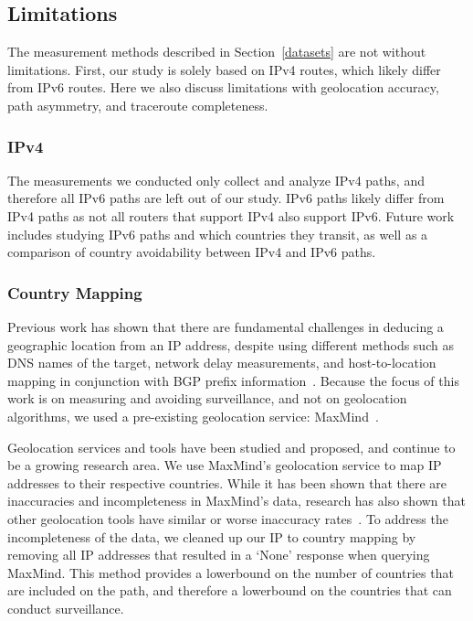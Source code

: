 \subsection{Limitations}
The measurement methods described in Section~\ref{datasets} are not without limitations.  First, our study is solely based on IPv4 routes, which likely differ from IPv6 routes.  Here we also discuss limitations with geolocation accuracy, path asymmetry, and traceroute completeness.

\subsubsection{IPv4}
The measurements we conducted only collect and analyze IPv4 paths, and therefore all IPv6 paths are left out of our study.  IPv6 paths likely differ from IPv4 paths as not all routers that support IPv4 also support IPv6.  Future work includes studying IPv6 paths and which countries they transit, as well as a comparison of country avoidability between IPv4 and IPv6 paths. 

\subsubsection{Country Mapping}
Previous work has shown that there are fundamental challenges in deducing a geographic location from an IP address, despite using different methods such as DNS names of the target, network delay measurements, and host-to-location mapping in conjunction with BGP prefix information~\cite{padmanabhan2001investigation}.  Because the focus of this work is on measuring and avoiding surveillance, and not on geolocation algorithms, we used a pre-existing geolocation service: MaxMind~\cite{maxmind}.

Geolocation services and tools have been studied and proposed, and continue to be a growing research area.  We use MaxMind's geolocation service to map IP addresses to their respective countries.  While it has been shown that there are inaccuracies and incompleteness in MaxMind's data, research has also shown that other geolocation tools have similar or worse inaccuracy rates~\cite{huffaker2011geocompare}.  To address the incompleteness of the data, we cleaned up our IP to country mapping by removing all IP addresses that resulted in a `None' response when querying MaxMind.  This method provides a lowerbound on the number of countries that are included on the path, and therefore a lowerbound on the countries that can conduct surveillance.  


